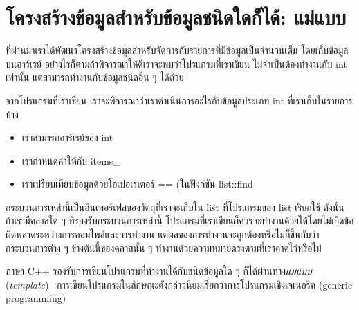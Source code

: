 \section{โครงสร้าง{\wbr}ข้อมูล{\wbr}สำหรับ{\wbr}ข้อมูล{\wbr}ชนิด{\wbr}ใด{\wbr}ก็ได้: แม่แบบ}
ที่{\wbr}ผ่าน{\wbr}มา{\wbr}เรา{\wbr}ได้{\wbr}พัฒนา{\wbr}โครงสร้าง{\wbr}ข้อมูล{\wbr}สำหรับ{\wbr}จัดการ{\wbr}กับ{\wbr}รายการ{\wbr}ที่{\wbr}มี{\wbr}ข้อมูล{\wbr}เป็น{\wbr}จำนวนเต็ม{\wbr}
โดย{\wbr}เก็บ{\wbr}ข้อมูล{\wbr}บน{\wbr}อาร์เรย์ อย่างไรก็ตาม{\wbr}ถ้า{\wbr}พิจารณา{\wbr}ให้{\wbr}ดี{\wbr}เรา{\wbr}จะ{\wbr}พบ{\wbr}ว่า{\wbr}โปรแกรม{\wbr}ที่{\wbr}เรา{\wbr}เขียน{\wbr}
ไม่{\wbr}จำเป็น{\wbr}ต้อง{\wbr}ทำงาน{\wbr}กับ {\ct int} เท่านั้น แต่{\wbr}สามารถ{\wbr}ทำงาน{\wbr}กับ{\wbr}ข้อมูล{\wbr}ชนิด{\wbr}อื่น ๆ ได้{\wbr}ด้วย{\wbr}

จาก{\wbr}โปรแกรม{\wbr}ที่{\wbr}เรา{\wbr}เขียน เรา{\wbr}จะ{\wbr}พิจารณา{\wbr}ว่า{\wbr}เรา{\wbr}ดำเนินการ{\wbr}อะไร{\wbr}กับ{\wbr}ข้อมูล{\wbr}ประเภท {\ct int}
ที่{\wbr}เรา{\wbr}เก็บ{\wbr}ใน{\wbr}รายการ{\wbr}บ้าง{\wbr}
\begin{itemize}
\item เรา{\wbr}สามารถ{\wbr}อาร์เรย์{\wbr}ของ {\ct int}
\item เรา{\wbr}กำหนด{\wbr}ค่า{\wbr}ให้{\wbr}กับ {\ct items\_}
\item เรา{\wbr}เปรียบเทียบ{\wbr}ข้อมูล{\wbr}ด้วย{\wbr}โอ{\wbr}เปอเรเตอร์ {\ct ==} (ใน{\wbr}ฟังก์ชัน {\ct list::find}
\end{itemize}
กระบวนการ{\wbr}เหล่านี้{\wbr}เป็น{\wbr}อิน{\wbr}เทอร์เฟส{\wbr}ของ{\wbr}วัตถุ{\wbr}ที่{\wbr}เรา{\wbr}จะ{\wbr}เก็บ{\wbr}ใน {\ct list} ที่{\wbr}โปรแกรม{\wbr}ของ{\wbr}
{\ct list} เรียก{\wbr}ใช้ ดังนั้น ถ้า{\wbr}เรา{\wbr}มี{\wbr}ค{\wbr}ลา{\wbr}ส{\wbr}ใด ๆ ที่{\wbr}รองรับ{\wbr}กระบวนการ{\wbr}เหล่านี้{\wbr}
โปรแกรม{\wbr}ที่{\wbr}เรา{\wbr}เขียน{\wbr}ก็{\wbr}ควร{\wbr}จะ{\wbr}ทำงาน{\wbr}ด้วย{\wbr}ได้{\wbr}โดย{\wbr}ไม่{\wbr}เกิด{\wbr}ข้อผิดพลาด{\wbr}ระหว่าง{\wbr}การ{\wbr}คอมไพล์{\wbr}และ{\wbr}การ{\wbr}ทำงาน{\wbr}
แต่{\wbr}ผล{\wbr}ของ{\wbr}การ{\wbr}ทำงาน{\wbr}จะ{\wbr}ถูกต้อง{\wbr}หรือ{\wbr}ไม่{\wbr}ก็{\wbr}ขึ้น{\wbr}กับ{\wbr}ว่า{\wbr}กระบวนการ{\wbr}ต่าง ๆ ข้างต้น{\wbr}นี้{\wbr}ของ{\wbr}ค{\wbr}ลา{\wbr}ส{\wbr}นั้น ๆ
ทำงาน{\wbr}ด้วย{\wbr}ความหมาย{\wbr}ตรง{\wbr}ตาม{\wbr}ที่{\wbr}เรา{\wbr}คาด{\wbr}ไว้{\wbr}หรือ{\wbr}ไม่{\wbr}

ภาษา C++ รองรับ{\wbr}การ{\wbr}เขียน{\wbr}โปรแกรม{\wbr}ที่ทำงาน{\wbr}ได้{\wbr}กับ{\wbr}ชนิด{\wbr}ข้อมูล{\wbr}ใด ๆ ก็ได้{\wbr}ผ่าน{\wbr}ทาง{\em แม่แบบ}
({\em template})
\ การ{\wbr}เขียน{\wbr}โปรแกรม{\wbr}ใน{\wbr}ลักษณะ{\wbr}ดังกล่าว{\wbr}นิยม{\wbr}เรียก{\wbr}ว่า{\wbr}การ{\wbr}โปรแกรม{\wbr}เชิง{\wbr}เจ{\wbr}เน{\wbr}อริ{\wbr}ค (generic
programming)

